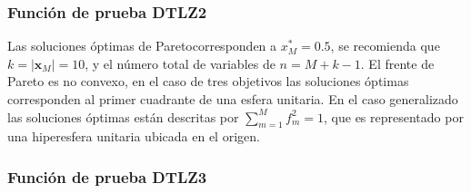 \subsubsection*{Función de prueba DTLZ2}
Las soluciones óptimas de Paretocorresponden a $x^*_M = 0.5$, se recomienda que $k=|\mathbf{x}_M| = 10$, y el número total de variables de $n=M+k-1$.
%
El frente de Pareto es no convexo, en el caso de tres objetivos las soluciones óptimas corresponden al primer cuadrante de una esfera unitaria. 
%
En el caso generalizado las soluciones óptimas están descritas por $\sum_{m=1}^M f_m^2 = 1$, que es representado por una hiperesfera unitaria ubicada en el origen.
%

\subsubsection*{Función de prueba DTLZ3}


